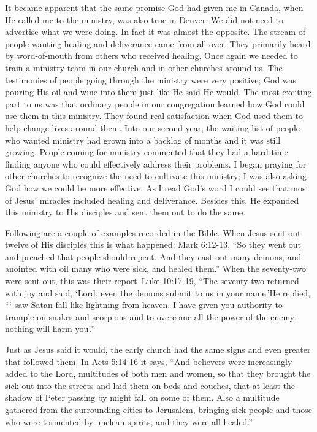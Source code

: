 \documentclass[oneside]{book}
\begin{document}
It became apparent that the same promise God had given me in Canada, when He called me to the ministry, was also true in Denver. We did not need to advertise what we were doing. In fact it was almost the opposite. The stream of people wanting healing and deliverance came from all over. They primarily heard by word-of-mouth from others who received healing. Once again we needed to train a ministry team in our church and in other churches around us. The testimonies of people going through the ministry were very positive; God was pouring His oil and wine into them just like He said He would. The most exciting part to us was that ordinary people in our congregation learned how God could use them in this ministry. They found real satisfaction when God used them to help change lives around them. Into our second year, the waiting list of people who wanted ministry had grown into a backlog of months and it was still growing. People coming for ministry commented that they had a hard time finding anyone who could effectively address their problems. I began praying for other churches to recognize the need to cultivate this ministry; I was also asking God how we could be more effective. As I read God’s word I could see that most of Jesus’ miracles included healing and deliverance. Besides this, He expanded this ministry to His disciples and sent them out to do the same.

Following are a couple of examples recorded in the Bible. When Jesus sent out twelve of His disciples this is what happened: Mark 6:12-13, “So they went out and preached that people should repent. And they cast out many demons, and anointed with oil many who were sick, and healed them.” When the seventy-two were sent out, this was their report--Luke 10:17-19, “The seventy-two returned with joy and said, ‘Lord, even the demons submit to us in your name.’He replied, “‘ saw Satan fall like lightning from heaven. I have given you authority to trample on snakes and scorpions and to overcome all the power of the enemy; nothing will harm you’.” 

Just as Jesus said it would, the early church had the same signs and even greater that followed them. In Acts 5:14-16 it says, “And believers were increasingly added to the Lord, multitudes of both men and women, so that they brought the sick out into the streets and laid them on beds and couches, that at least the shadow of Peter passing by might fall on some of them. Also a multitude gathered from the surrounding cities to Jerusalem, bringing sick people and those who were tormented by unclean spirits, and they were all healed.”
\end{document}
